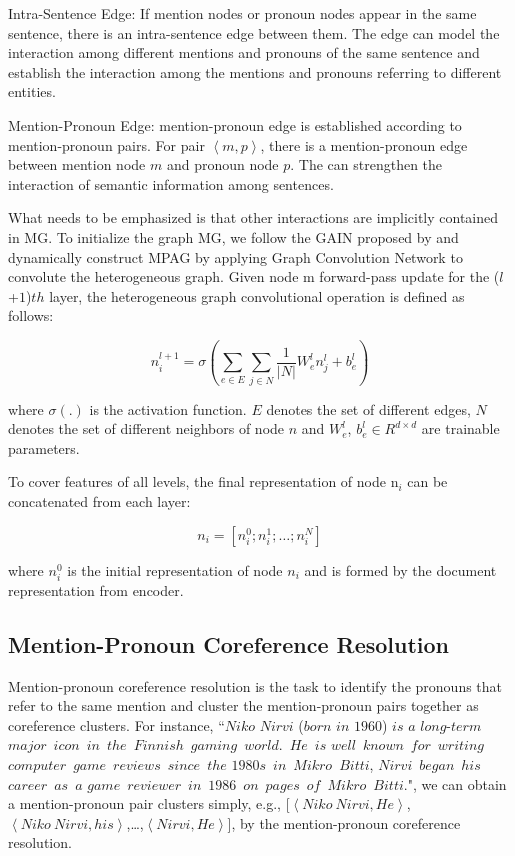 \documentclass{article}
\begin{document}
Intra-Sentence Edge: If mention nodes or pronoun nodes appear in the same sentence, there is an intra-sentence edge between them. The edge can model the interaction among different mentions and pronouns of the same sentence and establish the interaction among the mentions and pronouns referring to different entities.

Mention-Pronoun Edge: mention-pronoun edge is established according to mention-pronoun pairs. For pair $\left<m, p\right>$, there is a mention-pronoun edge between mention node $m$ and pronoun node $p$. The can strengthen the interaction of semantic information among sentences.

What needs to be emphasized is that other interactions are implicitly contained in MG. 
To initialize the graph MG, we follow the GAIN proposed by \cite{zeng2020double} and dynamically construct MPAG by applying Graph Convolution Network \cite{kipf2017semi} to convolute the heterogeneous graph. Given node m forward-pass update for the ($l$+$1$)$th$ layer, the heterogeneous graph convolutional operation is defined as follows:
 
\begin{equation}
n_{i}^{l+1}=\sigma\left(\sum_{e \in E} \sum_{j \in N} \frac{1}{|N|} W_{e}^{l} n_{j}^{l}+b_{e}^{l}\right)
\label{eql1}
\end{equation}

where $\sigma(.)$ is the activation function. $E$ denotes the set of different edges, $N$ denotes the set of different neighbors of node $n$ and $W_{e}^{l}$, $b_{e}^{l} \in R^{d \times d}$ are trainable parameters.

To cover features of all levels, the final representation of node $\mathrm{n}_{i}$ can be concatenated from each layer:

\begin{equation}
n_{i}=\left[n_{i}^{0} ; n_{i}^{1} ; \ldots ; n_{i}^{N}\right]
\label{eql2}
\end{equation}

where $n_{i}^{0}$ is the initial representation of node $n_{i}$ and is formed by the document representation from encoder.

\subsection{Mention-Pronoun Coreference Resolution}

Mention-pronoun coreference resolution is the task to identify the pronouns that refer to the same mention and cluster the mention-pronoun pairs together as coreference clusters. For instance, ``$Niko$ $Nirvi$ ($born$ $in$ $1960$) $is$ $a$ $long$-$term$~$major$~$icon$~$in$~$the$~$Finnish$~$gaming$~$world$.~$He$~$is$ $well$~$known$~$for$~$writing$~$computer$~$game$~$reviews$~$since$~$the$ $1980s$~$in$~$Mikro$~$Bitti$, $Nirvi$~$began$~$his$~$career$~$as$~$a$ $game$~$reviewer$~$in$~$1986$~$on$~$pages$~$of$~$Mikro$~$Bitti$.", we can obtain a mention-pronoun pair clusters simply, e.g., [$\left<Niko~Nirvi, He\right>$,$\left<Niko~Nirvi, his\right>$,\dots,$\left<Nirvi, He\right>$], by the mention-pronoun coreference resolution. 
\end{document}
